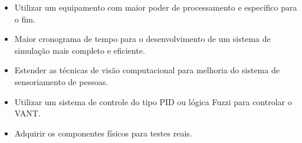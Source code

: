 \begin{itemize}
	\item Utilizar um equipamento com maior poder de processamento e especifico para o fim.
	\item Maior cronograma de tempo para o desenvolvimento de um sistema de simulação mais completo e eficiente.
	\item Estender as técnicas de visão computacional para melhoria do sistema de sensoriamento de pessoas.
	\item Utilizar um sistema de controle do tipo PID ou lógica Fuzzi para controlar o VANT.
	\item Adquirir os componentes físicos para testes reais.
\end{itemize}